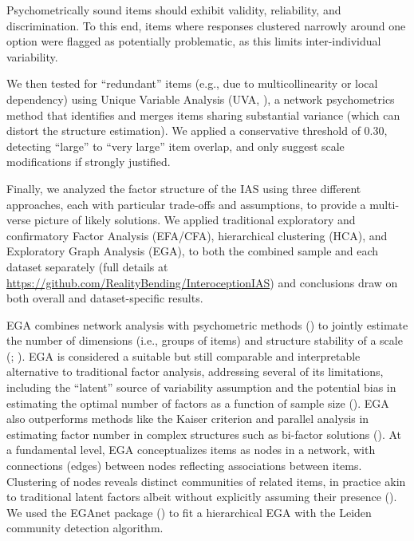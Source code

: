 \documentclass[
  jou,
  floatsintext,
  longtable,
  nolmodern,
  notxfonts,
  notimes,
  colorlinks=true,linkcolor=blue,citecolor=blue,urlcolor=blue]{apa7}
\begin{document}
Psychometrically sound items should exhibit validity, reliability, and
discrimination. To this end, items where responses clustered narrowly
around one option were flagged as potentially problematic, as this
limits inter-individual variability.

We then tested for ``redundant'' items (e.g., due to multicollinearity
or local dependency) using Unique Variable Analysis (UVA,
), a
network psychometrics method that identifies and merges items sharing
substantial variance (which can distort the structure estimation). We
applied a conservative threshold of 0.30, detecting ``large'' to ``very
large'' item overlap, and only suggest scale modifications if strongly
justified.

Finally, we analyzed the factor structure of the IAS using three
different approaches, each with particular trade-offs and assumptions,
to provide a multi-verse picture of likely solutions. We applied
traditional exploratory and confirmatory Factor Analysis (EFA/CFA),
hierarchical clustering (HCA), and Exploratory Graph Analysis (EGA), to
both the combined sample and each dataset separately (full details at
\url{https://github.com/RealityBending/InteroceptionIAS}) and
conclusions draw on both overall and dataset-specific results.

EGA combines network analysis with psychometric methods
() to
jointly estimate the number of dimensions (i.e., groups of items) and
structure stability of a scale
(;
).
EGA is considered a suitable but still comparable and interpretable
alternative to traditional factor analysis, addressing several of its
limitations, including the ``latent'' source of variability assumption
and the potential bias in estimating the optimal number of factors as a
function of sample size
(). EGA also outperforms methods like the Kaiser criterion and
parallel analysis in estimating factor number in complex structures such
as bi-factor solutions (). At a fundamental level, EGA conceptualizes items as
nodes in a network, with connections (edges) between nodes reflecting
associations between items. Clustering of nodes reveals distinct
communities of related items, in practice akin to traditional latent
factors albeit without explicitly assuming their presence
(). We used the EGAnet package
()
to fit a hierarchical EGA with the Leiden community detection algorithm.
\end{document}
